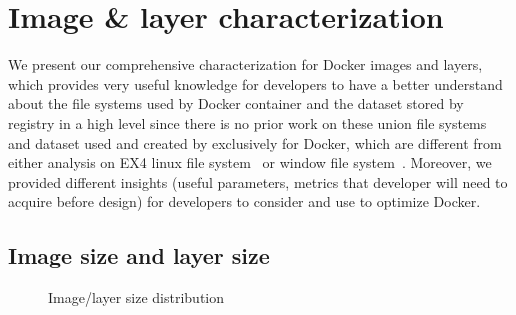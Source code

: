 \section{Image \& layer characterization}
\label{sec:redundant_layers}

We present our comprehensive characterization for Docker images and layers, which provides very useful knowledge for developers to have a better understand about the file systems used by Docker container and the dataset stored by registry in a high level since there is no prior work on these union file systems~\cite{xxx} and dataset used and created by exclusively for Docker, which are different from either analysis on EX4 linux file system~\cite{xxx} or window file system~\cite{xxx}. Moreover, we provided different insights (useful parameters, metrics that developer will need to acquire before design) for developers to consider and use to optimize Docker.

\subsection{Image size and layer size}
\begin{figure}[!t]
	\centering
	\caption{Image/layer size distribution}
	\label{fig:image-layer-size}
\end{figure}

